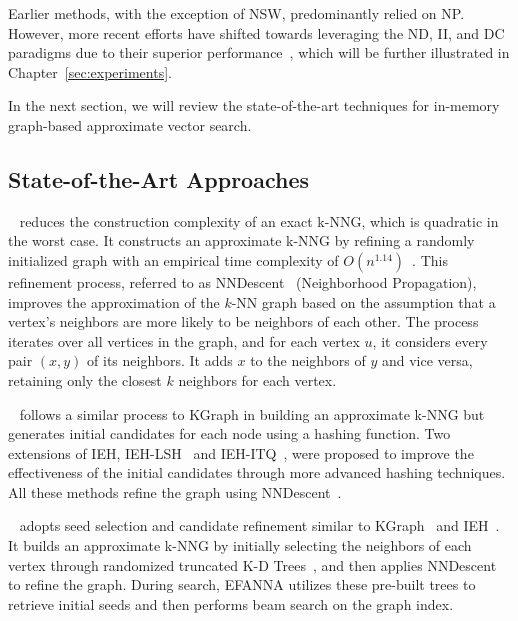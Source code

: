 Earlier methods, with the exception of NSW, predominantly relied on NP. However, more recent efforts have shifted towards leveraging the ND, II, and DC paradigms due to their superior performance~\cite{aumuller2017ann, shimomura2021survey, graph-survey-vldb}, which will be further illustrated in Chapter~\ref{sec:experiments}.

In the next section, we will review the state-of-the-art techniques for in-memory graph-based approximate vector search.

\subsection{State-of-the-Art Approaches} 

~\cite{kgraph} reduces the construction complexity of an exact k-NNG, which is quadratic in the worst case. It constructs an approximate k-NNG by refining a randomly initialized graph with an empirical time complexity of \( O(n^{1.14}) \)~\cite{nndescent}. This refinement process, referred to as NNDescent~\cite{nndescent} (Neighborhood Propagation), improves the approximation of the \( k \)-NN graph based on the assumption that a vertex's neighbors are more likely to be neighbors of each other. The process iterates over all vertices in the graph, and for each vertex \( u \), it considers every pair \( (x,y) \) of its neighbors. It adds \( x \) to the neighbors of \( y \) and vice versa, retaining only the closest \( k \) neighbors for each vertex.

~\cite{ieh} follows a similar process to KGraph in building an approximate k-NNG but generates initial candidates for each node using a hashing function. Two extensions of IEH, IEH-LSH~\cite{iehlsh} and IEH-ITQ~\cite{iehitq}, were proposed to improve the effectiveness of the initial candidates through more advanced hashing techniques. All these methods refine the graph using NNDescent~\cite{nndescent}.

~\cite{efanna} adopts seed selection and candidate refinement similar to KGraph~\cite{kgraph} and IEH~\cite{ieh}. It builds an approximate k-NNG by initially selecting the neighbors of each vertex through randomized truncated K-D Trees~\cite{dasgupta2008random}, and then applies NNDescent~\cite{nndescent} to refine the graph. During search, EFANNA utilizes these pre-built trees to retrieve initial seeds and then performs beam search on the graph index.

